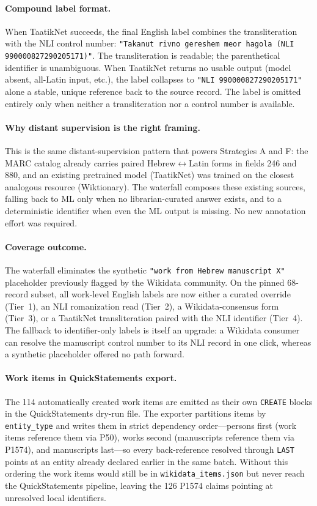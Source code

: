 \documentclass[Afour,sageh,times]{sagej}
\newcommand{\code}[1]{\texttt{#1}}
\begin{document}
\paragraph{Compound label format.}
When TaatikNet succeeds, the final English label combines the transliteration with the NLI control number: \code{"Takanut rivno gereshem meor hagola (NLI 990000827290205171)"}. The transliteration is readable; the parenthetical identifier is unambiguous. When TaatikNet returns no usable output (model absent, all-Latin input, etc.), the label collapses to \code{"NLI 990000827290205171"} alone \textemdash{} a stable, unique reference back to the source record. The label is omitted entirely only when neither a transliteration nor a control number is available.

\paragraph{Why distant supervision is the right framing.}
This is the same distant-supervision pattern that powers Strategies A and F: the MARC catalog already carries paired Hebrew$\leftrightarrow$Latin forms in fields 246 and 880, and an existing pretrained model (TaatikNet) was trained on the closest analogous resource (Wiktionary). The waterfall composes these existing sources, falling back to ML only when no librarian-curated answer exists, and to a deterministic identifier when even the ML output is missing. No new annotation effort was required.

\paragraph{Coverage outcome.}
The waterfall eliminates the synthetic \code{"work from Hebrew manuscript X"} placeholder previously flagged by the Wikidata community. On the pinned 68-record subset, all work-level English labels are now either a curated override (Tier~1), an NLI romanization read (Tier~2), a Wikidata-consensus form (Tier~3), or a TaatikNet transliteration paired with the NLI identifier (Tier~4). The fallback to identifier-only labels is itself an upgrade: a Wikidata consumer can resolve the manuscript control number to its NLI record in one click, whereas a synthetic placeholder offered no path forward.

\paragraph{Work items in QuickStatements export.}
The 114 automatically created work items are emitted as their own \code{CREATE} blocks in the QuickStatements dry-run file. The exporter partitions items by \code{entity\_type} and writes them in strict dependency order---persons first (work items reference them via P50), works second (manuscripts reference them via P1574), and manuscripts last---so every back-reference resolved through \code{LAST} points at an entity already declared earlier in the same batch. Without this ordering the work items would still be in \texttt{wikidata\_items.json} but never reach the QuickStatements pipeline, leaving the 126 P1574 claims pointing at unresolved local identifiers.
\end{document}
